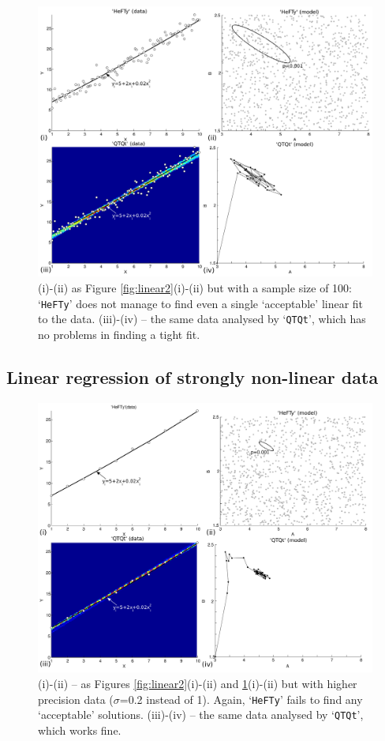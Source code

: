 \documentclass{article}
\begin{document}
\begin{figure}[!ht]
\includegraphics[width=\textwidth]{fig4.png}
\caption{(i)-(ii) as Figure \ref{fig:linear2}(i)-(ii) but with a
  sample size of 100: `{\tt HeFTy}' does not manage to find even a
  single `acceptable' linear fit to the data.  (iii)-(iv) -- the same
  data analysed by `{\tt QTQt}', which has no problems in finding a
  tight fit.}
\label{fig:linear3}
\end{figure}

\subsection{Linear regression of strongly non-linear data}
\label{sec:polynomial}

\begin{figure}[!ht]
\includegraphics[width=\textwidth]{fig5.png}
\caption{(i)-(ii) -- as Figures \ref{fig:linear2}(i)-(ii) and
  \ref{fig:linear3}(i)-(ii) but with higher precision data
  ($\sigma$=0.2 instead of 1). Again, `{\tt HeFTy}' fails to find any
  `acceptable' solutions. (iii)-(iv) -- the same data analysed by
  `{\tt QTQt}', which works fine.}
\label{fig:linear4}
\end{figure}
\end{document}
